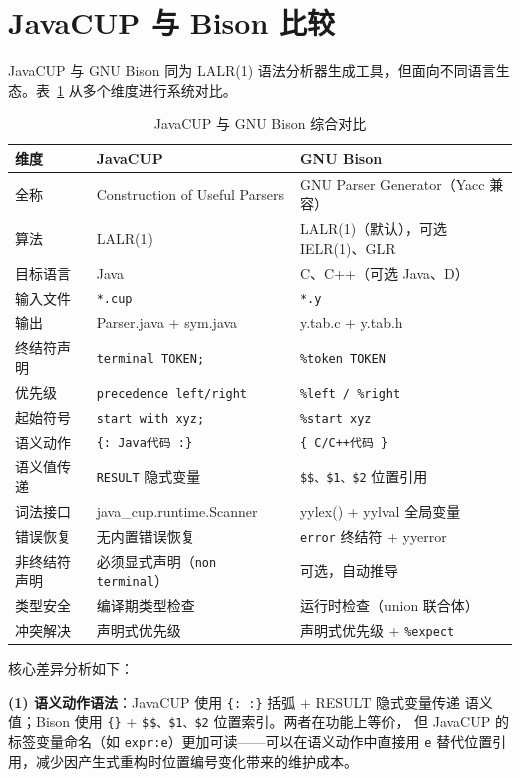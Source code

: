 \documentclass[a4paper]{article}
\begin{document}
\section{JavaCUP 与 Bison 比较}

JavaCUP 与 GNU Bison 同为 LALR(1) 语法分析器生成工具，但面向不同语言生态。表~\ref{tab:cup-bison}
从多个维度进行系统对比。

\begin{table}[H]
\centering
\caption{JavaCUP 与 GNU Bison 综合对比}
\label{tab:cup-bison}
\begin{tabular}{@{}p{3cm}p{5.5cm}p{5.5cm}@{}}
\toprule
\textbf{维度} & \textbf{JavaCUP} & \textbf{GNU Bison} \\
\midrule
全称 & Construction of Useful Parsers & GNU Parser Generator（Yacc 兼容） \\
算法 & LALR(1) & LALR(1)（默认），可选 IELR(1)、GLR \\
目标语言 & Java & C、C++（可选 Java、D） \\
输入文件 & \texttt{*.cup} & \texttt{*.y} \\
输出 & Parser.java + sym.java & y.tab.c + y.tab.h \\
终结符声明 & \texttt{terminal TOKEN;} & \texttt{\%token TOKEN} \\
优先级 & \texttt{precedence left/right} & \texttt{\%left / \%right} \\
起始符号 & \texttt{start with xyz;} & \texttt{\%start xyz} \\
语义动作 & \texttt{\{:\ Java代码\ :\}} & \texttt{\{ C/C++代码 \}} \\
语义值传递 & \texttt{RESULT} 隐式变量 & \texttt{\$\$、\$1、\$2} 位置引用 \\
词法接口 & java\_cup.runtime.Scanner & yylex() + yylval 全局变量 \\
错误恢复 & 无内置错误恢复 & \texttt{error} 终结符 + yyerror \\
非终结符声明 & 必须显式声明（\texttt{non terminal}） & 可选，自动推导 \\
类型安全 & 编译期类型检查 & 运行时检查（union 联合体） \\
冲突解决 & 声明式优先级 & 声明式优先级 + \texttt{\%expect} \\
\bottomrule
\end{tabular}
\end{table}

核心差异分析如下：

\textbf{(1) 语义动作语法}：JavaCUP 使用 \texttt{\{:\ :\}} 括弧 + RESULT 隐式变量传递
语义值；Bison 使用 \texttt{\{\}} + \texttt{\$\$、\$1、\$2} 位置索引。两者在功能上等价，
但 JavaCUP 的标签变量命名（如 \texttt{expr:e}）更加可读——可以在语义动作中直接用
\texttt{e} 替代位置引用，减少因产生式重构时位置编号变化带来的维护成本。
\end{document}
